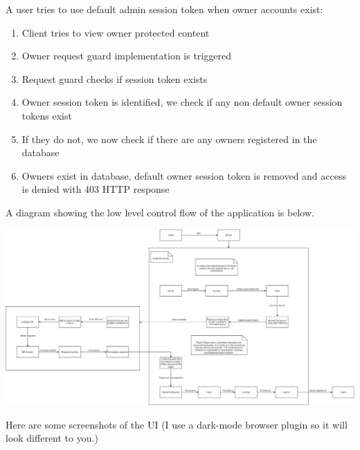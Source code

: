 \documentclass{article}
\begin{document}
A user tries to use default admin session token when owner accounts exist:
\begin{enumerate}
  \item Client tries to view owner protected content
  \item Owner request guard implementation is triggered
  \item Request guard checks if session token exists
  \item Owner session token is identified, we check if any non default owner session tokens exist
  \item If they do not, we now check if there are any owners registered in the database
  \item Owners exist in database, default owner session token is removed and access is denied with 403 HTTP response
\end{enumerate}

A diagram showing the low level control flow of the application is below.

\begin{landscape}
\includegraphics[height=\textwidth]{implementation}
\end{landscape}

Here are some screenshots of the UI (I use a dark-mode browser plugin so it will look different to you.)
\end{document}
